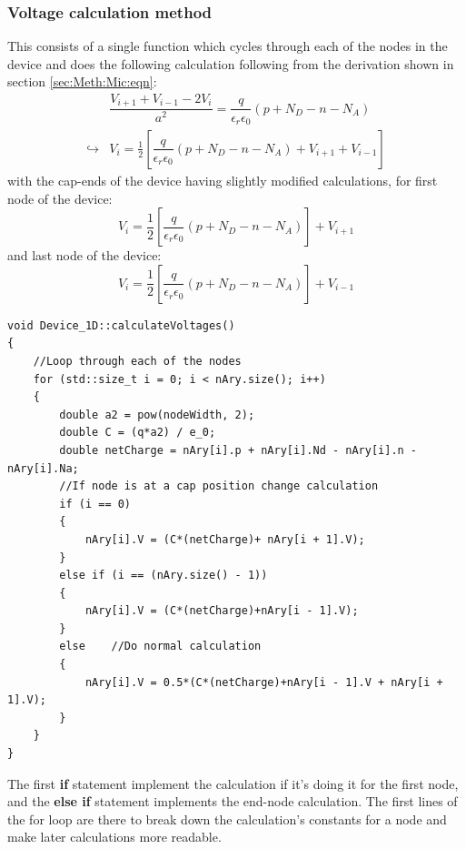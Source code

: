 \documentclass[titlepage]{article}
\begin{document}
\subsubsection{Voltage calculation method}
This consists of a single function which cycles through each of the nodes in the device and does the following calculation following from the derivation shown in section \ref{sec:Meth:Mic:eqn}:
\begin{eqnarray}
& \dfrac{V_{i+1}+V_{i-1}-2V_i}{a^2} = \dfrac{q}{\epsilon_r \epsilon_0}(p+N_D-n-N_A) \\
\hookrightarrow & V_i = \frac{1}{2}[\dfrac{q}{\epsilon_r \epsilon_0}(p+N_D-n-N_A) + V_{i+1}+V_{i-1}]
\end{eqnarray}
with the cap-ends of the device having slightly modified calculations, for first node of the device:
\begin{equation}
V_i = \frac{1}{2}[\dfrac{q}{\epsilon_r \epsilon_0}(p+N_D-n-N_A)] + V_{i+1} 
\end{equation}
and last node of the device:
\begin{equation}
V_i = \frac{1}{2}[\dfrac{q}{\epsilon_r \epsilon_0}(p+N_D-n-N_A)] + V_{i-1} 
\end{equation}
\begin{lstlisting}[caption = Voltage calculation method]
void Device_1D::calculateVoltages()
{
	//Loop through each of the nodes
	for (std::size_t i = 0; i < nAry.size(); i++)
	{
		double a2 = pow(nodeWidth, 2);
		double C = (q*a2) / e_0;
		double netCharge = nAry[i].p + nAry[i].Nd - nAry[i].n - nAry[i].Na;
		//If node is at a cap position change calculation
		if (i == 0)
		{
			nAry[i].V = (C*(netCharge)+ nAry[i + 1].V);
		}
		else if (i == (nAry.size() - 1))
		{
			nAry[i].V = (C*(netCharge)+nAry[i - 1].V);
		}
		else	//Do normal calculation
		{
			nAry[i].V = 0.5*(C*(netCharge)+nAry[i - 1].V + nAry[i + 1].V);
		}
	}
}
\end{lstlisting}
\medskip
The first \textbf{if} statement implement the calculation if it's doing it for the first node, and the \textbf{else if} statement implements the end-node calculation. The first lines of the for loop are there to break down the calculation's constants for a node and make later calculations more readable. 
\end{document}
